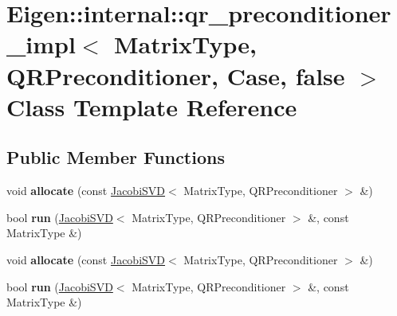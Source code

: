 \hypertarget{class_eigen_1_1internal_1_1qr__preconditioner__impl_3_01_matrix_type_00_01_q_r_preconditioner_00_01_case_00_01false_01_4}{}\section{Eigen\+:\+:internal\+:\+:qr\+\_\+preconditioner\+\_\+impl$<$ Matrix\+Type, Q\+R\+Preconditioner, Case, false $>$ Class Template Reference}
\label{class_eigen_1_1internal_1_1qr__preconditioner__impl_3_01_matrix_type_00_01_q_r_preconditioner_00_01_case_00_01false_01_4}
\subsection*{Public Member Functions}
\begin{DoxyCompactItemize}
\item 
\mbox{\label{class_eigen_1_1internal_1_1qr__preconditioner__impl_3_01_matrix_type_00_01_q_r_preconditioner_00_01_case_00_01false_01_4_a01b0ec87576066bf204beaadddf9a8a0}} 
void {\bfseries allocate} (const \hyperlink{group___s_v_d___module_class_eigen_1_1_jacobi_s_v_d}{Jacobi\+S\+VD}$<$ Matrix\+Type, Q\+R\+Preconditioner $>$ \&)
\item 
\mbox{\label{class_eigen_1_1internal_1_1qr__preconditioner__impl_3_01_matrix_type_00_01_q_r_preconditioner_00_01_case_00_01false_01_4_abeec41257bdf659db9940e51544c4073}} 
bool {\bfseries run} (\hyperlink{group___s_v_d___module_class_eigen_1_1_jacobi_s_v_d}{Jacobi\+S\+VD}$<$ Matrix\+Type, Q\+R\+Preconditioner $>$ \&, const Matrix\+Type \&)
\item 
\mbox{\label{class_eigen_1_1internal_1_1qr__preconditioner__impl_3_01_matrix_type_00_01_q_r_preconditioner_00_01_case_00_01false_01_4_a01b0ec87576066bf204beaadddf9a8a0}} 
void {\bfseries allocate} (const \hyperlink{group___s_v_d___module_class_eigen_1_1_jacobi_s_v_d}{Jacobi\+S\+VD}$<$ Matrix\+Type, Q\+R\+Preconditioner $>$ \&)
\item 
\mbox{\label{class_eigen_1_1internal_1_1qr__preconditioner__impl_3_01_matrix_type_00_01_q_r_preconditioner_00_01_case_00_01false_01_4_abeec41257bdf659db9940e51544c4073}} 
bool {\bfseries run} (\hyperlink{group___s_v_d___module_class_eigen_1_1_jacobi_s_v_d}{Jacobi\+S\+VD}$<$ Matrix\+Type, Q\+R\+Preconditioner $>$ \&, const Matrix\+Type \&)
\end{DoxyCompactItemize}


